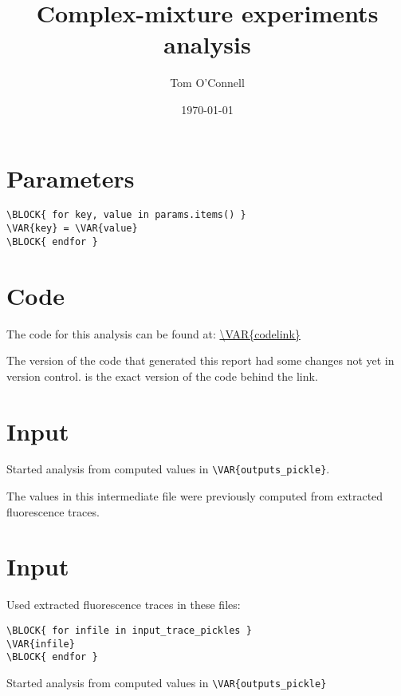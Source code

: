 \documentclass{article}
\begin{document}
\title{Complex-mixture experiments analysis}
\author{Tom O'Connell}
\date{\today}
\maketitle


\pagebreak

\begin{flushleft}
\section{Parameters}
\begin{verbatim}
\BLOCK{ for key, value in params.items() }
\VAR{key} = \VAR{value}
\BLOCK{ endfor }
\end{verbatim}

\section{Code}
The code for this analysis can be found at:
\linebreak
\url{\VAR{codelink}}

The version of the code that generated this report 
had some changes not yet in version control.
is the exact version of the code behind the link.


\section{Input}
Started analysis from computed values in \verb=\VAR{outputs_pickle}=.

The values in this intermediate file were previously computed from extracted
fluorescence traces.

\section{Input}
Used extracted fluorescence traces in these files:
\begin{verbatim}
\BLOCK{ for infile in input_trace_pickles }
\VAR{infile}
\BLOCK{ endfor }
\end{verbatim}
Started analysis from computed values in \verb=\VAR{outputs_pickle}=

\pagebreak
{}

\end{flushleft}
\end{document}
